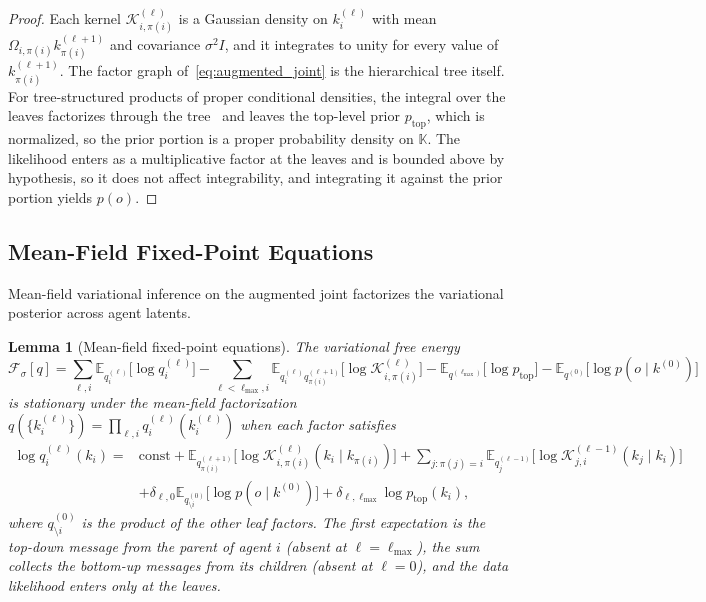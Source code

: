 \documentclass[11pt]{article}
\newtheorem{lemma}{Lemma}
\begin{document}
\begin{proof}
Each kernel $\mathcal{K}_{i,\pi(i)}^{(\ell)}$ is a Gaussian density on $k_i^{(\ell)}$ with mean $\Omega_{i,\pi(i)} k_{\pi(i)}^{(\ell+1)}$ and covariance $\sigma^2 I$, and it integrates to unity for every value of $k_{\pi(i)}^{(\ell+1)}$. The factor graph of~\eqref{eq:augmented_joint} is the hierarchical tree itself. For tree-structured products of proper conditional densities, the integral over the leaves factorizes through the tree~\cite[\S3.2]{Lauritzen1996} and leaves the top-level prior $p_{\mathrm{top}}$, which is normalized, so the prior portion is a proper probability density on $\mathbb{K}$. The likelihood enters as a multiplicative factor at the leaves and is bounded above by hypothesis, so it does not affect integrability, and integrating it against the prior portion yields $p(o)$.
\end{proof}

\subsection{Mean-Field Fixed-Point Equations}

Mean-field variational inference on the augmented joint factorizes the variational posterior across agent latents.

\begin{lemma}[Mean-field fixed-point equations]
\label{lem:mf_fixedpoint}
The variational free energy
\begin{equation}
\mathcal{F}_{\sigma}[q]
=
\sum_{\ell, i} \mathbb{E}_{q_i^{(\ell)}}\big[\log q_i^{(\ell)}\big]
- \sum_{\ell < \ell_{\max}, i} \mathbb{E}_{q_i^{(\ell)} q_{\pi(i)}^{(\ell+1)}}\big[\log \mathcal{K}_{i,\pi(i)}^{(\ell)}\big]
- \mathbb{E}_{q^{(\ell_{\max})}}\big[\log p_{\mathrm{top}}\big]
- \mathbb{E}_{q^{(0)}}\big[\log p(o \mid k^{(0)})\big]
\label{eq:mf_free_energy}
\end{equation}
is stationary under the mean-field factorization $q(\{k_i^{(\ell)}\}) = \prod_{\ell, i} q_i^{(\ell)}(k_i^{(\ell)})$ when each factor satisfies
\begin{equation}
\begin{aligned}
\log q_i^{(\ell)}(k_i)
={}&
\text{const}
+ \mathbb{E}_{q_{\pi(i)}^{(\ell+1)}}\big[\log \mathcal{K}_{i,\pi(i)}^{(\ell)}(k_i \mid k_{\pi(i)})\big]
+ \sum_{j : \pi(j) = i} \mathbb{E}_{q_j^{(\ell-1)}}\big[\log \mathcal{K}_{j,i}^{(\ell-1)}(k_j \mid k_i)\big]\\
&+ \delta_{\ell,0} \mathbb{E}_{q^{(0)}_{\setminus i}}\big[\log p(o \mid k^{(0)})\big]
+ \delta_{\ell,\ell_{\max}} \log p_{\mathrm{top}}(k_i),
\end{aligned}
\label{eq:mf_fixedpoint}
\end{equation}
where $q^{(0)}_{\setminus i}$ is the product of the other leaf factors. The first expectation is the top-down message from the parent of agent $i$ (absent at $\ell = \ell_{\max}$), the sum collects the bottom-up messages from its children (absent at $\ell = 0$), and the data likelihood enters only at the leaves.
\end{lemma}
\end{document}
